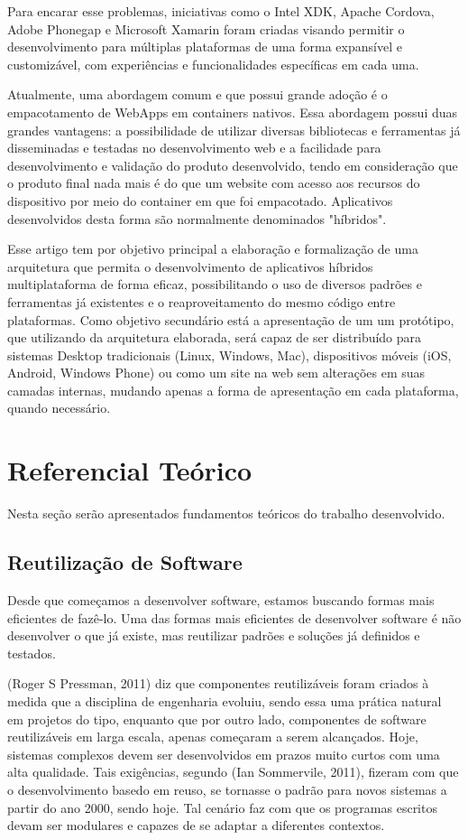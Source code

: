 Para encarar esse problemas, iniciativas como o Intel XDK, Apache Cordova, Adobe Phonegap e Microsoft Xamarin foram criadas visando permitir o desenvolvimento para múltiplas plataformas de uma forma expansível e customizável, com experiências e funcionalidades específicas em cada uma. 

Atualmente, uma abordagem comum e que possui grande adoção é o empacotamento de WebApps em containers nativos. Essa abordagem possui duas grandes vantagens: a possibilidade de utilizar diversas bibliotecas e ferramentas já disseminadas e testadas no desenvolvimento web e a facilidade para desenvolvimento e validação do produto desenvolvido, tendo em consideração que o produto final nada mais é do que um website com acesso aos recursos do dispositivo por meio do container em que foi empacotado. Aplicativos desenvolvidos desta forma são normalmente denominados "híbridos".

Esse artigo tem por objetivo principal a elaboração e formalização de uma arquitetura que permita o desenvolvimento de aplicativos híbridos multiplataforma de forma eficaz, possibilitando o uso de diversos padrões e ferramentas já existentes e o reaproveitamento do mesmo código entre plataformas. Como objetivo secundário está a apresentação de um um protótipo, que utilizando da arquitetura elaborada, será capaz de ser distribuído para sistemas Desktop tradicionais (Linux, Windows, Mac), dispositivos móveis (iOS, Android, Windows Phone) ou como um site na web sem alterações em suas camadas internas, mudando apenas a forma de apresentação em cada plataforma, quando necessário.

\section{\esp Referencial Teórico}

Nesta seção serão apresentados fundamentos teóricos do trabalho desenvolvido.

\subsection{\esp Reutilização de Software}

Desde que começamos a desenvolver software, estamos buscando formas mais eficientes de fazê-lo. Uma das formas mais eficientes de desenvolver software é não desenvolver o que já existe, mas reutilizar padrões e soluções já definidos e testados. 

(Roger S Pressman, 2011) diz que componentes reutilizáveis foram criados à medida que a disciplina de engenharia evoluiu, sendo essa uma prática natural em projetos do tipo, enquanto que por outro lado, componentes de software reutilizáveis em larga escala, apenas começaram a serem alcançados. Hoje, sistemas complexos devem ser desenvolvidos em prazos muito curtos com uma alta qualidade. Tais exigências, segundo (Ian Sommervile, 2011), fizeram com que o desenvolvimento basedo em reuso, se tornasse o padrão para novos sistemas a partir do ano 2000, sendo hoje. Tal cenário faz com que os programas escritos devam ser modulares e capazes de se adaptar a diferentes contextos.

